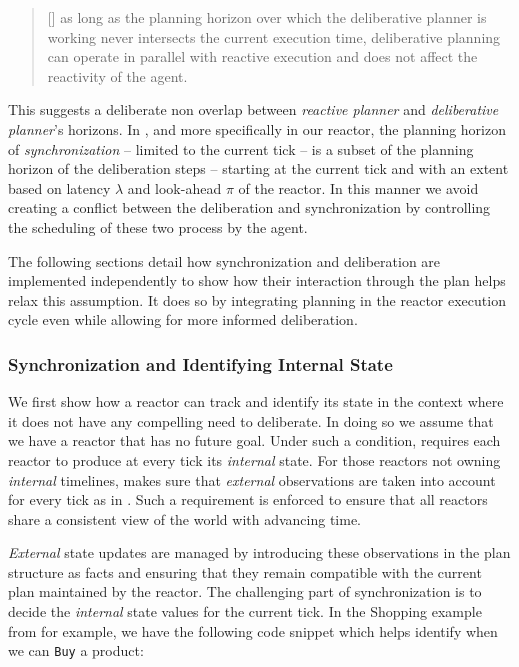 {\scriptsize
  \begin{quote}
  [\textellipsis] as long as the planning horizon over which the
  deliberative planner is working never intersects the current
  execution time, deliberative planning can operate in parallel with
  reactive execution and does not affect the reactivity of the agent. 
\end{quote}}

This suggests a deliberate non overlap between  {\em
  reactive planner} and {\em deliberative planner}'s horizons. In
\rxe, and more specifically in our  reactor,
the planning horizon of {\em synchronization} -- limited to the
current tick -- is a subset of the planning horizon of the
deliberation steps -- starting at the current tick and with an extent
based on latency $\lambda$ and look-ahead $\pi$ of the reactor. In
this manner we avoid creating a conflict between the deliberation and
synchronization by controlling the scheduling of these two
process by the \rx agent.

The following sections detail how synchronization and deliberation are
implemented independently to show how their interaction through the
plan helps relax this assumption. It does so by integrating planning
in the reactor execution cycle even while allowing for more informed
deliberation.

\subsubsection{Synchronization and Identifying Internal State}
\label{sec:arch:synch}

We first show how a reactor can track and identify its state in the
context where it does not have any compelling need to deliberate. In
doing so we assume that we have a reactor that has no future
goal. Under such a condition, \rx requires each reactor to produce at
every tick its {\em internal} state. For those reactors not owning
{\em internal} timelines, \rx makes sure that {\em external}
observations are taken into account for every tick as in
\cite{py10}. Such a requirement is enforced to ensure that all
reactors share a consistent view of the world with advancing time.

{\em External} state updates are managed by introducing these
observations in the plan structure as facts and ensuring that they
remain compatible with the current plan maintained by the reactor. The
challenging part of synchronization is to decide the {\em internal}
state values for the current tick. In the Shopping example from
 for example, we have the
following code snippet which helps identify when we can \texttt{Buy} a
product:

